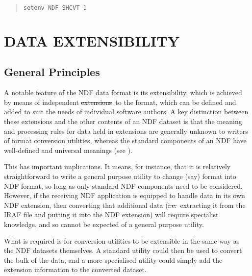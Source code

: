 \begin{quote}
\begin{small}
\begin{verbatim}
setenv NDF_SHCVT 1
\end{verbatim}
\end{small}
\end{quote}

\section{DATA EXTENSIBILITY}

\subsection{General Principles}

A notable feature of the NDF data format is its extensibility, which
is achieved by means of independent
\st{extensions\footnotemark}\ to the format, which can be defined and added to suit the
needs of individual software authors.  A key distinction between these
extensions and the other contents of an NDF dataset is that the
meaning and processing rules for data held in extensions are generally
unknown to writers of format conversion utilities, whereas the
standard components of an NDF have well-defined and universal meanings
(see ).

This has important implications. It means, for instance, that it is
relatively straightforward to write a general purpose utility to
change (say)  format into NDF format, so long as
only standard NDF components need to be considered. However, if the
receiving NDF application is equipped to handle data in its own NDF
extension, then converting that additional data
(\st{i.e.}\ extracting it from the IRAF file and putting it into the
NDF extension) will require specialist knowledge, and so cannot be
expected of a general purpose utility.

What is required is for conversion utilities to be extensible in the
same way as the NDF datasets themselves. A standard utility could then
be used to convert the bulk of the data, and a more specialised
utility could simply add the extension information to the converted
dataset.

